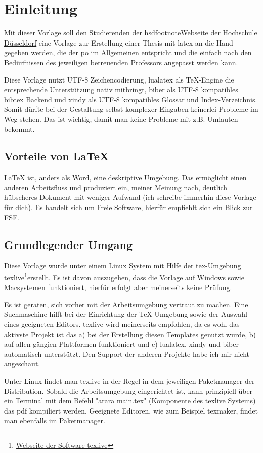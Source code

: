 \newpage
\section{Einleitung}
Mit dieser Vorlage soll den Studierenden der \gls{hsd}footnote{\href{https://www.hs-duesseldorf.de}{Webseite der Hochschule Düsseldorf}} eine Vorlage zur Erstellung einer Thesis mit \gls{latex} an die Hand gegeben werden, die der \gls{po} im Allgemeinen entspricht und die einfach nach den Bedürfnissen des jeweiligen betreuenden Professors angepasst werden kann.

Diese Vorlage nutzt UTF-8 Zeichencodierung, lualatex als TeX-Engine die entsprechende Unterstützung nativ mitbringt, biber als UTF-8 kompatibles bibtex Backend und xindy als UTF-8 kompatibles Glossar und Index-Verzeichnis. Somit dürfte bei der Gestaltung selbst komplexer Eingaben keinerlei Probleme im Weg stehen. Das ist wichtig, damit man keine Probleme mit z.B. Umlauten bekommt.
\subsection{Vorteile von LaTeX}
LaTeX ist, anders als Word, eine deskriptive Umgebung. Das ermöglicht einen anderen Arbeitsfluss und produziert ein, meiner Meinung nach, deutlich hübscheres Dokument mit weniger Aufwand (ich schreibe immerhin diese Vorlage für dich).
Es handelt sich um Freie Software, hierfür empfiehlt sich ein Blick zur \gls{FSF}.
\subsection{Grundlegender Umgang}
Diese Vorlage wurde unter einem Linux System mit Hilfe der tex-Umgebung texlive\footnote{\href{https://tug.org/texlive/}{Webseite der Software texlive}}erstellt. Es ist davon auszugehen, dass die Vorlage auf Windows sowie Macsystemen funktioniert, hierfür erfolgt aber meinerseits keine Prüfung.

Es ist geraten, sich vorher mit der Arbeitsumgebung vertraut zu machen. Eine Suchmaschine hilft bei der Einrichtung der TeX-Umgebung sowie der Auswahl eines geeigneten Editors. texlive wird meinerseits empfohlen, da es wohl das aktivste Projekt ist das a) bei der Erstellung diesen Templates genutzt wurde, b) auf allen gängien Plattformen funktioniert und c) lualatex, xindy und biber automatisch unterstützt. Den Support der anderen Projekte habe ich mir nicht angeschaut.

Unter Linux findet man texlive in der Regel in dem jeweiligen Paketmanager der Distribution. Sobald die Arbeitsumgebung eingerichtet ist, kann prinzipiell über ein Terminal mit dem Befehl "arara main.tex" (Komponente des texlive Systems) das pdf kompiliert werden.
Geeignete Editoren, wie zum Beispiel texmaker, findet man ebenfalls im Paketmanager.

